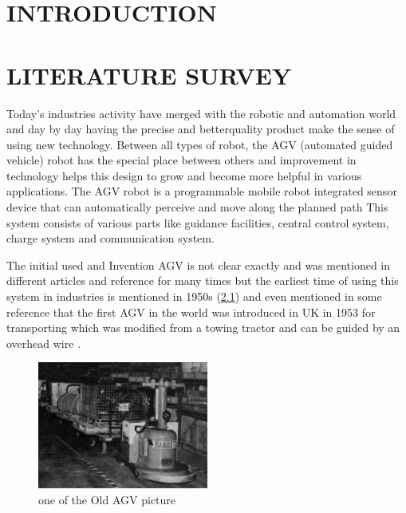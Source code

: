 \documentclass[main]{subfiles}
\begin{document}
\chapter{\hfil INTRODUCTION \hfil}
\justifying

\newpage
\centering
\chapter{\hfil LITERATURE SURVEY \hfil}
\justifying
Today’s industries activity have merged
with the robotic and automation world and
day by day having the precise and betterquality
product make the sense of using
new technology. Between all types of
robot, the AGV (automated guided
vehicle) robot has the special place
between others and improvement in
technology helps this design to grow and
become more helpful in various
applications. The AGV robot is a
programmable mobile robot integrated
sensor device that can automatically
perceive and move along the planned
path\cite{das2016design} This system consists of various
parts like guidance facilities, central
control system, charge system and
communication system\cite{moshayedi2019agv}. 

The initial used and Invention AGV is not clear exactly and
was mentioned in different articles and
reference for many times but the earliest
time of using this system in industries is
mentioned in 1950s \cite{reveliotis2000conflict}
(\cref{oldAgv}) and even
mentioned in some reference that the first
AGV in the world was introduced in UK in
1953 for transporting which was modified
from a towing tractor and can be guided by
an overhead wire \cite{moshayedi2019agv}.

\begin{figure}[H]
    \centering
\includegraphics[width=0.5\textwidth]{doc/oldestAGV.jpg}
\caption{one of the Old AGV picture}
\label{oldAgv} %
\end{figure}
\end{document}
